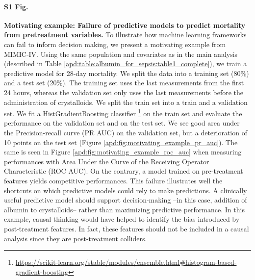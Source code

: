 \documentclass[10pt,letterpaper]{article}
\begin{document}
\paragraph*{S1 Fig.}
\label{apd:motivating_example}
{\bf Motivating example: Failure of predictive models to predict mortality
  from pretreatment variables.}
To illustrate how machine learning frameworks can fail to inform decision
making, we present a motivating example from MIMIC-IV. Using the same
population and covariates as in the main analysis (described in Table
\ref{apd:table:albumin_for_sepsis:table1_complete}), we train a predictive
model for 28-day mortality. We split the data into a training set (80\%) and a
test set (20\%). The training set uses the last measurements from the first 24
hours, whereas the validation set only uses the last measurements before the
administration of crystalloids. We split the train set into a train and a
validation set. We fit a HistGradientBoosting classifier
\footnote{\url{https://scikit-learn.org/stable/modules/ensemble.html\#histogram-based-gradient-boosting}}
on the train set and evaluate the performance on the validation set and on the
test set. We see good area under the Precision-recall curve (PR AUC) on the
validation set, but a deterioration of 10 points on the test set (Figure
\ref{apd:fig:motivating_example_pr_auc}). The same is seen in Figure
\ref{apd:fig:motivating_example_roc_auc} when measuring performances with Area
Under the Curve of the Receiving Operator Characteristic (ROC AUC). On the
contrary, a model trained on pre-treatment features yields competitive
performances. This failure illustrates well the shortcuts on which predictive
models could rely to make predictions. A clinically useful predictive model
should support decision-making --in this case, addition of albumin to
crystalloids-- rather than maximizing predictive performance. In this example,
causal thinking would have helped to identify the bias introduced by
post-treatment features. In fact, these features should not be included in a
causal analysis since they are post-treatment colliders.
\end{document}
